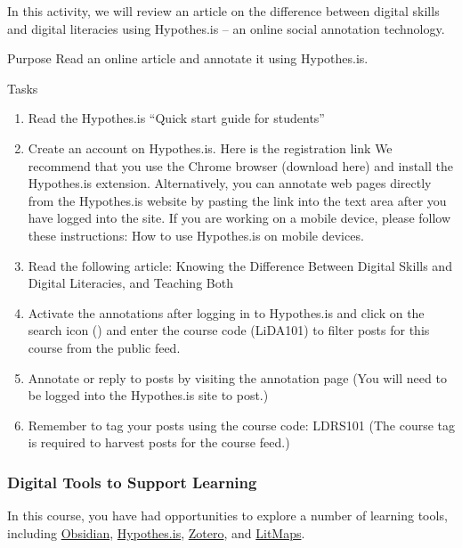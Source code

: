 \documentclass[
]{book}
\providecommand{\tightlist}{%
  \setlength{\itemsep}{0pt}\setlength{\parskip}{0pt}}
\theoremstyle{definition}
\theoremstyle{definition}
\theoremstyle{definition}
\theoremstyle{definition}
\theoremstyle{remark}
\begin{document}
\begin{reflect}
In this activity, we will review an article on the difference between digital skills and digital literacies using Hypothes.is -- an online social annotation technology.

Purpose
Read an online article and annotate it using Hypothes.is.

Tasks

\begin{enumerate}
\def\labelenumi{\arabic{enumi}.}
\tightlist
\item
  Read the Hypothes.is ``Quick start guide for students''
\item
  Create an account on Hypothes.is. Here is the registration link
  We recommend that you use the Chrome browser (download here) and install the Hypothes.is extension. Alternatively, you can annotate web pages directly from the Hypothes.is website by pasting the link into the text area after you have logged into the site. If you are working on a mobile device, please follow these instructions: How to use Hypothes.is on mobile devices.
\item
  Read the following article: Knowing the Difference Between Digital Skills and Digital Literacies, and Teaching Both
\item
  Activate the annotations after logging in to Hypothes.is and click on the search icon () and enter the course code (LiDA101) to filter posts for this course from the public feed.
\item
  Annotate or reply to posts by visiting the annotation page (You will need to be logged into the Hypothes.is site to post.)
\item
  Remember to tag your posts using the course code: LDRS101 (The course tag is required to harvest posts for the course feed.)
\end{enumerate}
\end{reflect}

\hypertarget{digital-tools-to-support-learning}{%
\subsubsection*{Digital Tools to Support Learning}\label{digital-tools-to-support-learning}}

In this course, you have had opportunities to explore a number of learning tools, including \href{https://obsidian.md}{Obsidian}, \href{https://trinitywestern.teamdynamix.com/TDClient/1904/Portal/KB/ArticleDet?ID=146716}{Hypothes.is}, \href{https://www.zotero.org/}{Zotero}, and \href{https://www.litmaps.com/}{LitMaps}.
\end{document}
